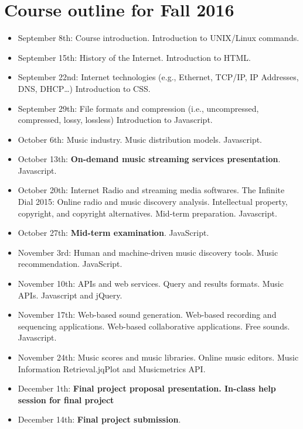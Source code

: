 \documentclass[11pt]{amsart}
\begin{document}
\section{Course outline for Fall 2016}
\begin{itemize}
\item September 8th: Course introduction. Introduction to UNIX/Linux commands. 
\item September 15th: History of the Internet. Introduction to HTML.\@
\item September 22nd: Internet technologies (e.g., Ethernet, TCP/IP, IP Addresses, DNS, DHCP\ldots) Introduction to CSS.\@
\item September 29th: File formats and compression (i.e., uncompressed, compressed, lossy, lossless) Introduction to Javascript.
\item October 6th: Music industry. Music distribution models. Javascript.
\item October 13th: \textbf{On-demand music streaming services presentation}. Javascript.
\item October 20th: Internet Radio and streaming media softwares. The Infinite Dial 2015: Online radio and music discovery analysis. Intellectual property, copyright, and copyright alternatives. Mid-term preparation. Javascript.
\item October 27th: \textbf{Mid-term examination}. JavaScript.
\item November 3rd: Human and machine-driven music discovery tools. Music recommendation. JavaScript.
\item November 10th: APIs and web services. Query and results formats. Music APIs. Javascript and jQuery.
\item November 17th: Web-based sound generation. Web-based recording and sequencing applications. Web-based collaborative applications. Free sounds. Javascript.


\item November 24th: Music scores and music libraries. Online music editors. Music Information Retrieval.\@ jqPlot and Musicmetrics API.\@

\item December 1th: \textbf{Final project proposal presentation. In-class help session for final project}
\item December 14th: \textbf{Final project submission}.
\end{itemize}
\end{document}

